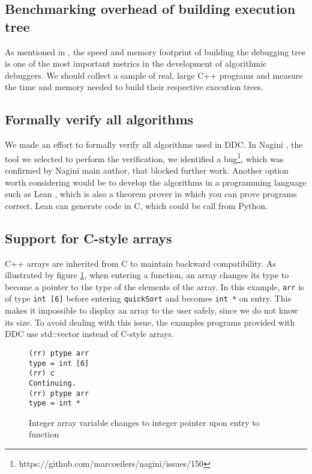 \subsection{Benchmarking overhead of building execution tree}
As mentioned in \cite{Survey}, the speed and memory footprint of building the debugging tree is one of the most important metrics in the development of algorithmic debuggers.
We should collect a sample of real, large C++ programs and measure the time and memory needed to build their respective execution trees.
\subsection{Formally verify all algorithms}
We made an effort to formally verify all algorithms used in DDC.
In Nagini \cite{nagini}, the tool we selected to perform the verification, we identified a bug\footnote{https://github.com/marcoeilers/nagini/issues/150}, which was confirmed by Nagini main author, that blocked further work. 
Another option worth considering would be to develop the algorithms in a programming language such as Lean \cite{lean}, which is also a theorem prover in which you can prove programs correct.
Lean can generate code in C, which could be call from Python.
\subsection{Support for C-style arrays}
C++ arrays are inherited from C to maintain backward compatibility.
As illustrated by figure \ref{fig:array_to_pointer}, when entering a function, an array changes its type to become a pointer to the type of the elements of the array.
In this example, \verb|arr| is of type \verb|int [6]| before entering \verb|quickSort| and becomes \verb|int *| on entry.
This makes it impossible to display an array to the user safely, since we do not know its size.
To avoid dealing with this issue, the examples programs provided with DDC use std::vector instead of C-style arrays.
\begin{figure}[h]
    \centering
    \caption{Integer array variable changes to integer pointer upon entry to function}
    \label{fig:array_to_pointer}
    \begin{verbatim}
(rr) ptype arr
type = int [6]
(rr) c
Continuing.
(rr) ptype arr
type = int *
    \end{verbatim}
\end{figure}
